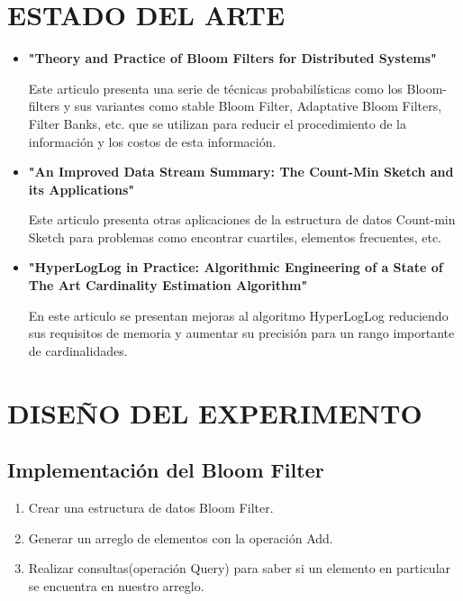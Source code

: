 \documentclass[journal]{IEEEtran}
\begin{document}
\section{ESTADO DEL ARTE}

\begin{itemize}

\item \textbf{"Theory and Practice of Bloom Filters for Distributed Systems"}

Este articulo presenta una serie de t\'ecnicas probabil\'isticas como los Bloom-filters y sus variantes como stable Bloom Filter, Adaptative Bloom Filters, Filter Banks, etc. que se utilizan para reducir el procedimiento de la informaci\'on y los costos de esta informaci\'on.\\

\item \textbf{"An Improved Data Stream Summary: The Count-Min Sketch and its Applications"}

Este articulo presenta otras aplicaciones de la estructura de datos Count-min Sketch para problemas como encontrar cuartiles, elementos frecuentes, etc.\\

\item \textbf{"HyperLogLog in Practice: Algorithmic Engineering of a State of The Art Cardinality Estimation Algorithm"}

En este articulo se presentan mejoras al algoritmo HyperLogLog reduciendo sus requisitos de memoria y aumentar su precisi\'on para un rango importante de cardinalidades.\\

\end{itemize}


\section{DISE\~NO DEL EXPERIMENTO}

\subsection{Implementaci\'on del Bloom Filter}

    \begin{enumerate}
	    \item
            Crear una estructura de datos Bloom Filter.
	    \item
	    Generar un arreglo de elementos con la operaci\'on Add.
	    \item
	    Realizar consultas(operaci\'on Query) para saber si un elemento en particular se encuentra en nuestro arreglo.
        \end{enumerate}
\end{document}
